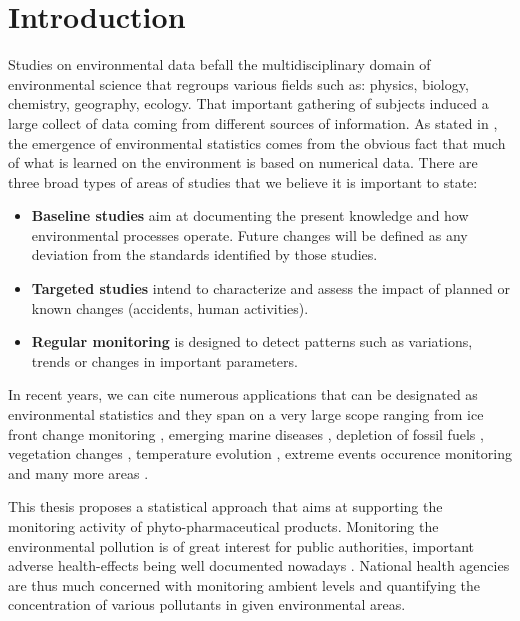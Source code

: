 \chapter{Introduction}\label{chp:1}



Studies on environmental data befall the multidisciplinary domain of environmental science that regroups various fields such as: physics, biology, chemistry, geography, ecology. That important gathering of subjects induced a large collect of data coming from different sources of information. As stated in \cite{Manly2008}, the emergence of environmental statistics comes from the obvious fact that much of what is learned on the environment is based on numerical data. There are three broad types of areas of studies that we believe it is important to state: 
\begin{itemize}
    \item \textbf{Baseline studies} aim at documenting the present knowledge and how environmental processes operate. Future changes will be defined as any deviation from the standards identified by those studies.
    \item \textbf{Targeted studies} intend to characterize and assess the impact of planned or known changes (accidents, human activities). 
    \item \textbf{Regular monitoring} is designed to detect patterns such as variations, trends or changes in important parameters.  
\end{itemize}
In recent years, we can cite numerous applications that can be designated as environmental statistics and they span on a very large scope ranging from ice front change monitoring \cite{BUNCE_2018}, emerging marine diseases \cite{Harvell1999}, depletion of fossil fuels \citep{Hoeoek2013}, vegetation changes \citep{Zheng2021}, temperature evolution \citep{Shi2022}, extreme events occurence monitoring \citep{Zhao2010} and many more areas \citep{Ozgul2010,Mori2012}. 

This thesis proposes a statistical approach that aims at supporting the monitoring activity of phyto-pharmaceutical products. Monitoring the environmental pollution is of great interest for public authorities, important adverse health-effects being well documented nowadays \citep{khopkar2007,Marchant2018,NOUGADERE201432}. National health agencies are thus much concerned with monitoring ambient levels and quantifying the concentration of various pollutants in given environmental areas. 

